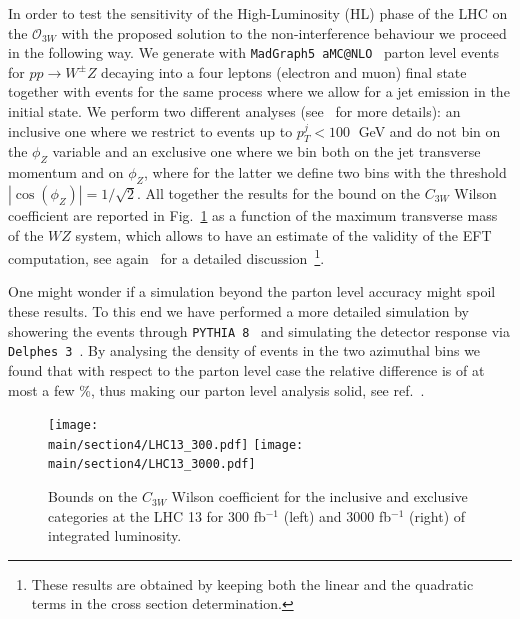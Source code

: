 \documentclass[../report.tex]{subfiles}
\providecommand{\main}{..}
\begin{document}
In order to test the sensitivity of the High-Luminosity (HL) phase of the LHC on the $\mathcal{O}_{3W}$ with the proposed solution to the non-interference behaviour we proceed in the following way. We generate with {\tt MadGraph5 aMC@NLO}~\cite{Alwall:2014hca} parton level events for $pp \to W^{\pm} Z $ decaying into a four leptons (electron and muon) final state together with events for the same process where we allow for a jet emission in the initial state. We perform two different analyses (see~\cite{Azatov:2017kzw} for more details): an inclusive one where we restrict to events up to $p_T^j<100\;$ GeV and do not bin on the $\phi_Z$ variable and an exclusive one where we bin both on the jet transverse momentum and on $\phi_Z$, where for the latter we define two bins with the threshold $|\cos(\phi_Z)|=1/\sqrt{2}$. All together the results for the bound on the $C_{3W}$ Wilson coefficient are reported in Fig.~\ref{fig:LHC13} as a function of the maximum transverse mass of the $WZ$ system, which allows to have an estimate of the validity of the EFT computation, see again~\cite{Azatov:2017kzw} for a detailed discussion~\footnote{These results are obtained by keeping both the linear and the quadratic terms in the cross section determination.}.

One might wonder if a simulation beyond the parton level accuracy might spoil these results. To this end we have performed a more detailed simulation by showering the events through {\tt PYTHIA 8}~\cite{Alwall:2014hca} and simulating the detector response via {\tt Delphes 3}~\cite{deFavereau:2013fsa}. By analysing the density of events in the two azimuthal bins we found that with respect to the parton level case the relative difference is of at most a few \%, thus making our parton level analysis solid, see ref.~\cite{ade}.


  
  \begin{figure}[h!]
\begin{center}
 \texttt{[image: \\main/section4/LHC13\_300.pdf]}{}\hspace{2cm}
 \texttt{[image: \\main/section4/LHC13\_3000.pdf]}{}
\end{center}
\caption{Bounds on the $C_{3W}$ Wilson coefficient for the inclusive and exclusive categories at the LHC 13 for 300 fb$^{-1}$ (left) and 3000 fb$^{-1}$ (right) of integrated luminosity.}
\label{fig:LHC13}
\end{figure}
\end{document}

